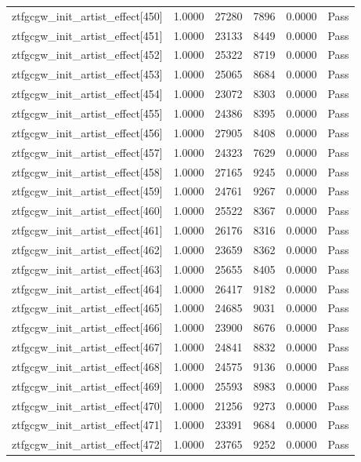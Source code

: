 \begin{table}[htbp]
\begin{tabular}{llrrll}
ztfgcgw\_init\_artist\_effect[450] & 1.0000 & 27280 & 7896 & 0.0000 & Pass \\
ztfgcgw\_init\_artist\_effect[451] & 1.0000 & 23133 & 8449 & 0.0000 & Pass \\
ztfgcgw\_init\_artist\_effect[452] & 1.0000 & 25322 & 8719 & 0.0000 & Pass \\
ztfgcgw\_init\_artist\_effect[453] & 1.0000 & 25065 & 8684 & 0.0000 & Pass \\
ztfgcgw\_init\_artist\_effect[454] & 1.0000 & 23072 & 8303 & 0.0000 & Pass \\
ztfgcgw\_init\_artist\_effect[455] & 1.0000 & 24386 & 8395 & 0.0000 & Pass \\
ztfgcgw\_init\_artist\_effect[456] & 1.0000 & 27905 & 8408 & 0.0000 & Pass \\
ztfgcgw\_init\_artist\_effect[457] & 1.0000 & 24323 & 7629 & 0.0000 & Pass \\
ztfgcgw\_init\_artist\_effect[458] & 1.0000 & 27165 & 9245 & 0.0000 & Pass \\
ztfgcgw\_init\_artist\_effect[459] & 1.0000 & 24761 & 9267 & 0.0000 & Pass \\
ztfgcgw\_init\_artist\_effect[460] & 1.0000 & 25522 & 8367 & 0.0000 & Pass \\
ztfgcgw\_init\_artist\_effect[461] & 1.0000 & 26176 & 8316 & 0.0000 & Pass \\
ztfgcgw\_init\_artist\_effect[462] & 1.0000 & 23659 & 8362 & 0.0000 & Pass \\
ztfgcgw\_init\_artist\_effect[463] & 1.0000 & 25655 & 8405 & 0.0000 & Pass \\
ztfgcgw\_init\_artist\_effect[464] & 1.0000 & 26417 & 9182 & 0.0000 & Pass \\
ztfgcgw\_init\_artist\_effect[465] & 1.0000 & 24685 & 9031 & 0.0000 & Pass \\
ztfgcgw\_init\_artist\_effect[466] & 1.0000 & 23900 & 8676 & 0.0000 & Pass \\
ztfgcgw\_init\_artist\_effect[467] & 1.0000 & 24841 & 8832 & 0.0000 & Pass \\
ztfgcgw\_init\_artist\_effect[468] & 1.0000 & 24575 & 9136 & 0.0000 & Pass \\
ztfgcgw\_init\_artist\_effect[469] & 1.0000 & 25593 & 8983 & 0.0000 & Pass \\
ztfgcgw\_init\_artist\_effect[470] & 1.0000 & 21256 & 9273 & 0.0000 & Pass \\
ztfgcgw\_init\_artist\_effect[471] & 1.0000 & 23391 & 9684 & 0.0000 & Pass \\
ztfgcgw\_init\_artist\_effect[472] & 1.0000 & 23765 & 9252 & 0.0000 & Pass \\

\end{tabular}
\end{table}
